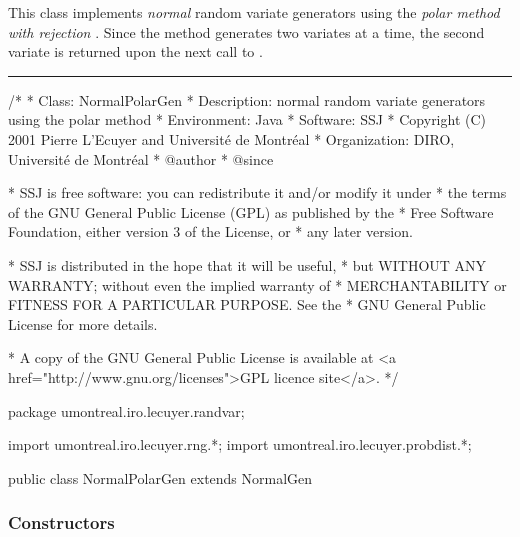
This class implements {\em normal\/} random variate generators using
 the {\em polar method with rejection} \cite{rMAR62a}.
Since the method generates two variates at a time,
the second variate is returned upon the next call to .


\bigskip\hrule

\begin{code}
\begin{hide}
/*
 * Class:        NormalPolarGen
 * Description:  normal random variate generators using the polar method
 * Environment:  Java
 * Software:     SSJ 
 * Copyright (C) 2001  Pierre L'Ecuyer and Université de Montréal
 * Organization: DIRO, Université de Montréal
 * @author       
 * @since

 * SSJ is free software: you can redistribute it and/or modify it under
 * the terms of the GNU General Public License (GPL) as published by the
 * Free Software Foundation, either version 3 of the License, or
 * any later version.

 * SSJ is distributed in the hope that it will be useful,
 * but WITHOUT ANY WARRANTY; without even the implied warranty of
 * MERCHANTABILITY or FITNESS FOR A PARTICULAR PURPOSE.  See the
 * GNU General Public License for more details.

 * A copy of the GNU General Public License is available at
   <a href="http://www.gnu.org/licenses">GPL licence site</a>.
 */
\end{hide}
package umontreal.iro.lecuyer.randvar;\begin{hide}
import umontreal.iro.lecuyer.rng.*;
import umontreal.iro.lecuyer.probdist.*;
\end{hide}

public class NormalPolarGen extends NormalGen \begin{hide} {

   // used by polar method which calculate always two random values;
   private boolean available = false;
   private double[] variates = new double[2];
   private static double[] staticVariates = new double[2];
\end{hide}\end{code}

\subsubsection* {Constructors}

